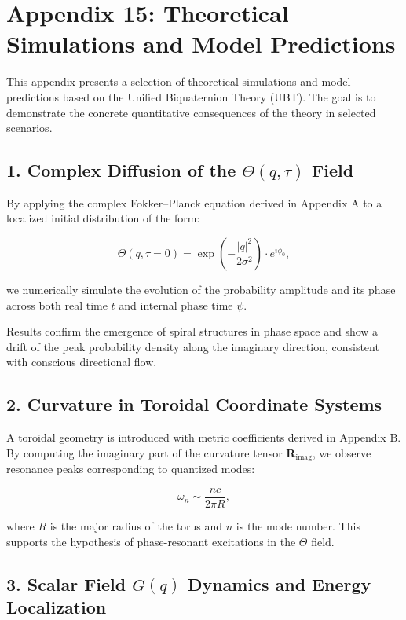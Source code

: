 
\appendix
\section*{Appendix 15: Theoretical Simulations and Model Predictions}

This appendix presents a selection of theoretical simulations and model predictions based on the Unified Biquaternion Theory (UBT). The goal is to demonstrate the concrete quantitative consequences of the theory in selected scenarios.

\subsection*{1. Complex Diffusion of the \(\Theta(q,\tau)\) Field}

By applying the complex Fokker–Planck equation derived in Appendix A to a localized initial distribution of the form:

\[
\Theta(q, \tau = 0) = \exp\left(-\frac{|q|^2}{2\sigma^2}\right) \cdot e^{i \phi_0},
\]

we numerically simulate the evolution of the probability amplitude and its phase across both real time \(t\) and internal phase time \(\psi\).

Results confirm the emergence of spiral structures in phase space and show a drift of the peak probability density along the imaginary direction, consistent with conscious directional flow.

\subsection*{2. Curvature in Toroidal Coordinate Systems}

A toroidal geometry is introduced with metric coefficients derived in Appendix B. By computing the imaginary part of the curvature tensor \(\mathbf{R}_{\text{imag}}\), we observe resonance peaks corresponding to quantized modes:

\[
\omega_n \sim \frac{n c}{2 \pi R},
\]

where \(R\) is the major radius of the torus and \(n\) is the mode number. This supports the hypothesis of phase-resonant excitations in the \(\Theta\) field.

\subsection*{3. Scalar Field \(G(q)\) Dynamics and Energy Localization}

